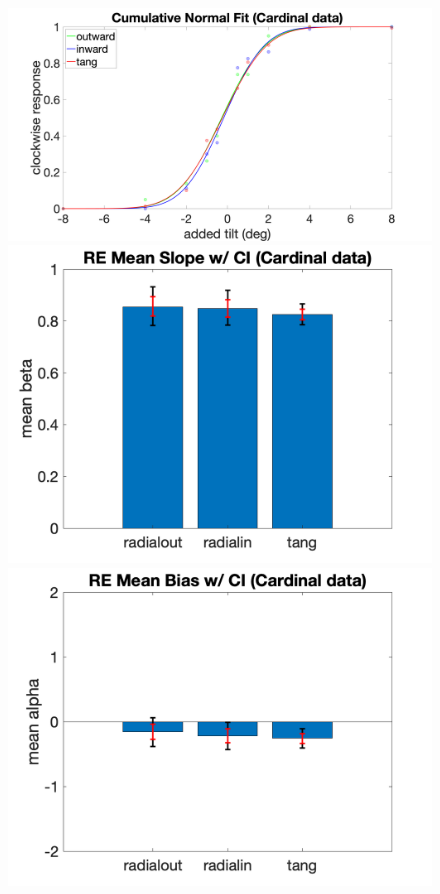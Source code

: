 \documentclass[11pt]{article} %
\begin{document}
\begin{figure}[H]
\includegraphics[scale=.06]{Images/PF_card.png}
\includegraphics[scale=.11]{Images/MeanSlopeError_card.png}
\includegraphics[scale=.11]{Images/MeanBiasError_card.png}

\end{figure}
\end{document}
